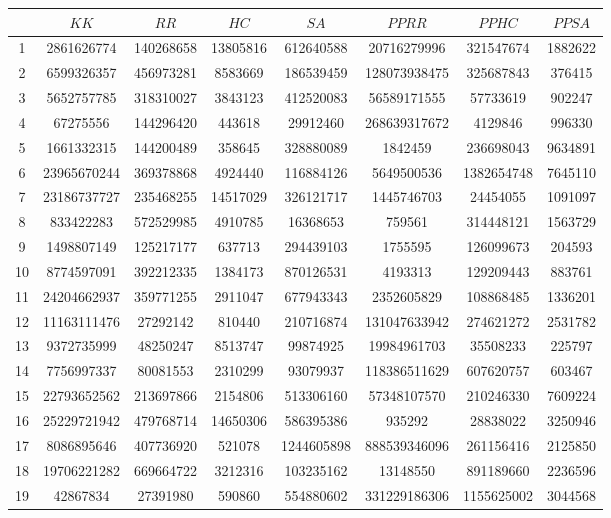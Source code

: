 \documentclass[solution, letterpaper]{cs121}
\begin{document}
\begin{center}
\begin{tabular}{ c |c c c c c c c}
   & $KK$ & $RR$ & $HC$ & $SA$ & $PPRR$ & $PPHC$ & $PPSA$  \\
   \hline
1 & 2861626774 & 140268658 & 13805816 & 612640588 & 20716279996 & 321547674 & 1882622 \\
2 & 6599326357 & 456973281 & 8583669 & 186539459 & 128073938475 & 325687843 & 376415 \\
3 & 5652757785 & 318310027 & 3843123 & 412520083 & 56589171555 & 57733619 & 902247 \\
4 & 67275556 & 144296420 & 443618 & 29912460 & 268639317672 & 4129846 & 996330 \\
5 & 1661332315 & 144200489 & 358645 & 328880089 & 1842459 & 236698043 & 9634891 \\
6 & 23965670244 & 369378868 & 4924440 & 116884126 & 5649500536 & 1382654748 & 7645110 \\
7 & 23186737727 & 235468255 & 14517029 & 326121717 & 1445746703 & 24454055 & 1091097 \\
8 & 833422283 & 572529985 & 4910785 & 16368653 & 759561 & 314448121 & 1563729 \\
9 & 1498807149 & 125217177 & 637713 & 294439103 & 1755595 & 126099673 & 204593 \\
10 & 8774597091 & 392212335 & 1384173 & 870126531 & 4193313 & 129209443 & 883761 \\
11 & 24204662937 & 359771255 & 2911047 & 677943343 & 2352605829 & 108868485 & 1336201 \\
12 & 11163111476 & 27292142 & 810440 & 210716874 & 131047633942 & 274621272 & 2531782 \\
13 & 9372735999 & 48250247 & 8513747 & 99874925 & 19984961703 & 35508233 & 225797 \\
14 & 7756997337 & 80081553 & 2310299 & 93079937 & 118386511629 & 607620757 & 603467 \\
15 & 22793652562 & 213697866 & 2154806 & 513306160 & 57348107570 & 210246330 & 7609224 \\
16 & 25229721942 & 479768714 & 14650306 & 586395386 & 935292 & 28838022 & 3250946 \\
17 & 8086895646 & 407736920 & 521078 & 1244605898 & 888539346096 & 261156416 & 2125850 \\
18 & 19706221282 & 669664722 & 3212316 & 103235162 & 13148550 & 891189660 & 2236596 \\
19 & 42867834 & 27391980 & 590860 & 554880602 & 331229186306 & 1155625002 & 3044568 \\

\end{tabular}
\end{center}
\end{document}
